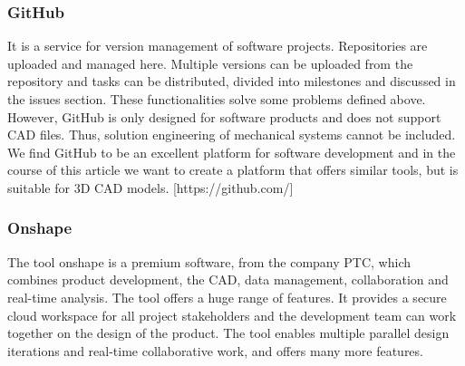     \subsubsection*{GitHub}
    It is a service for version management of software projects. Repositories are uploaded and managed here. Multiple versions can be uploaded from the repository and tasks can be distributed, divided into milestones and discussed in the issues section. These functionalities solve some problems defined above. However, GitHub is only designed for software products and does not support CAD files. Thus, solution engineering of mechanical systems cannot be included. We find GitHub to be an excellent platform for software development and in the course of this article we want to create a platform that offers similar tools, but is suitable for 3D CAD models. [https://github.com/]

    \subsubsection*{Onshape}
    The tool onshape is a premium software, from the company PTC, which combines product development, the CAD, data management, collaboration and real-time analysis. The tool offers a huge range of features. It provides a secure cloud workspace for all project stakeholders and the development team can work together on the design of the product. The tool enables multiple parallel design iterations and real-time collaborative work, and offers many more features. 

